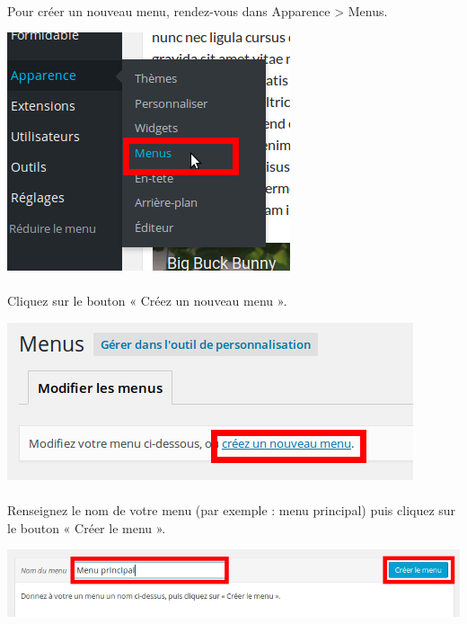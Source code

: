 \documentclass[10pt,a4paper]{article}
\begin{document}
\paragraph{}Pour créer un nouveau menu, rendez-vous dans Apparence > Menus.
\begin{center}
\includegraphics[scale=0.3]{img/0143.png}
\end{center}
\paragraph{}Cliquez sur le bouton « Créez un nouveau menu ».
\begin{center}
\includegraphics[scale=0.3]{img/0144.png}
\end{center}
\paragraph{}Renseignez le nom de votre menu (par exemple : menu principal) puis cliquez sur le bouton « Créer le menu ».
\begin{center}
\includegraphics[scale=0.3]{img/0145.png}
\end{center}
\end{document}
